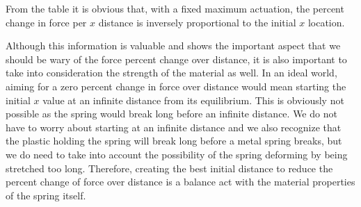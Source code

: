 \begin{table}[h!]
  \centering
  \caption{}
  \label{Tab:x_force}
\end{table}

From the table it is obvious that, with a fixed maximum actuation, the percent change in force per $ x $ distance is inversely proportional to the initial $ x $ location.

Although this information is valuable and shows the important aspect that we should be wary of the force percent change over distance, it is also important to take into consideration the strength of the material as well. In an ideal world, aiming for a zero percent change in force over distance would mean starting the initial $ x $ value at an infinite distance from its equilibrium. This is obviously not possible as the spring would break long before an infinite distance. We do not have to worry about starting at an infinite distance and we also recognize that the plastic holding the spring will break long before a metal spring breaks, but we do need to take into account the possibility of the spring deforming by being stretched too long. Therefore, creating the best initial distance to reduce the percent change of force over distance is a balance act with the material properties of the spring itself.

